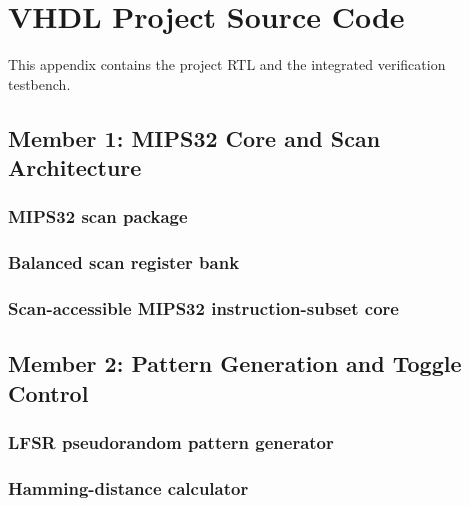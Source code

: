 \ifdefined\nobalance\nobalance\fi
\clearpage
\section{VHDL Project Source Code}
\label{app:sourcecode}
This appendix contains the project RTL and the integrated verification testbench.
\lstset{style=projectvhdl}

\subsection{Member 1: MIPS32 Core and Scan Architecture}
\subsubsection{MIPS32 scan package}
\leavevmode\par


\subsubsection{Balanced scan register bank}
\leavevmode\par


\subsubsection{Scan-accessible MIPS32 instruction-subset core}
\leavevmode\par


\subsection{Member 2: Pattern Generation and Toggle Control}
\subsubsection{LFSR pseudorandom pattern generator}
\leavevmode\par


\subsubsection{Hamming-distance calculator}
\leavevmode\par


